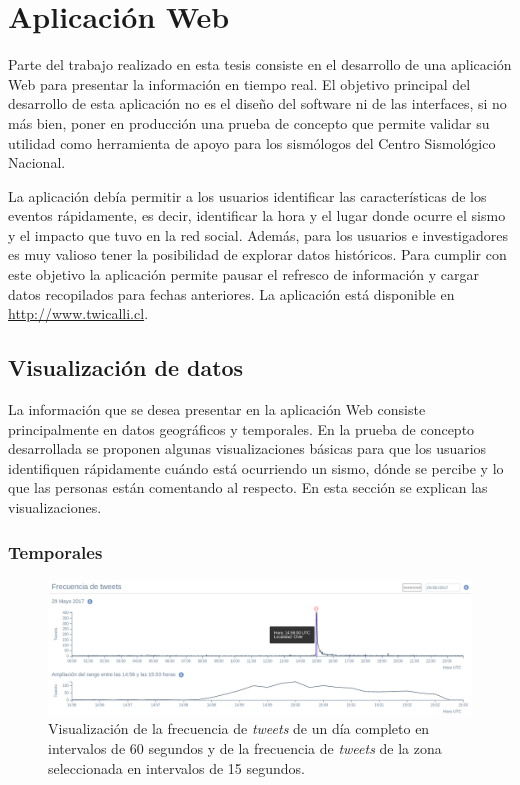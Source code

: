 \chapter{Aplicación Web}
\label{cap:aplicacion}

Parte del trabajo realizado en esta tesis consiste en el desarrollo de una aplicación Web para presentar la información en tiempo real. 
%
El objetivo principal del desarrollo de esta aplicación no es el diseño del software ni de las interfaces, si no más bien, poner en producción una prueba de concepto que permite validar su utilidad como herramienta de apoyo para los sismólogos del Centro Sismológico Nacional.


La aplicación debía permitir a los usuarios identificar las características de los eventos rápidamente, es decir, identificar la hora y el lugar donde ocurre el sismo y el impacto que tuvo en la red social.
%
Además, para los usuarios e investigadores es muy valioso tener la posibilidad de explorar datos históricos. Para cumplir con este objetivo la aplicación permite pausar el refresco de información y cargar datos recopilados para fechas anteriores.  
%
La aplicación está disponible en \url{http://www.twicalli.cl}.


\section{Visualización de datos}
\label{sec:visualizacion}

La información que se desea presentar en la aplicación Web consiste principalmente en datos geográficos y temporales. 
%
En la prueba de concepto desarrollada se proponen algunas visualizaciones básicas para que los usuarios identifiquen rápidamente cuándo está ocurriendo un sismo, dónde se percibe y lo que las personas están comentando al respecto.
%
En esta sección se explican las visualizaciones.


	\subsection{Temporales}
	
	\begin{figure}[ht]
	  \centering
	  \includegraphics[trim={0 0 0 0}, clip, width=\textwidth]{imagenes/linea_de_tiempo_interactive.png}
	  \caption{Visualización de la frecuencia de \textit{tweets} de un día completo en intervalos de 60 segundos y de la frecuencia de \textit{tweets} de la zona seleccionada en intervalos de 15 segundos.}
	\label{fig:timeline}
	\end{figure}
		
